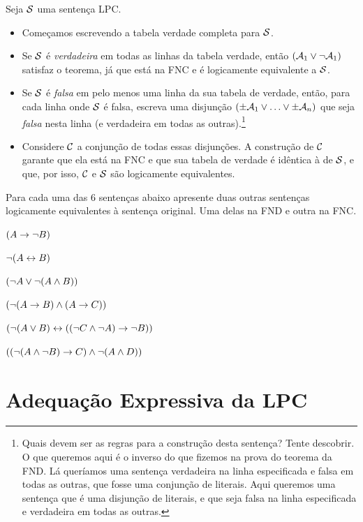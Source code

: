 Seja $\mathcal{S}$ uma sentença LPC.
	\begin{itemize}
       	\item Começamos escrevendo a tabela verdade completa para $\mathcal{S}$.
       	\item Se $\mathcal{S}$ é \emph{verdadeira} em todas as linhas da tabela verdade, então $(\mathcal{A}_1 \vee \neg \mathcal{A}_1)$ satisfaz o teorema, já que está na FNC e é logicamente equivalente a $\mathcal{S}$.
       	\item Se $\mathcal{S}$ é \emph{falsa} em pelo menos uma linha da sua tabela de verdade, então, para cada linha onde $\mathcal{S}$ é falsa, escreva uma disjunção $(\pm\mathcal{A}_1 \vee \ldots \vee \pm\mathcal{A}_n)$ que seja \emph{falsa} nesta linha (e verdadeira em todas as outras).\footnote{
       	Quais devem ser as regras para a construção desta sentença? Tente descobrir. O que queremos aqui é o inverso do que fizemos na prova do teorema da FND.
       	Lá queríamos uma sentença verdadeira na linha especificada e falsa em todas as outras, que fosse uma conjunção de literais.
       	Aqui queremos uma sentença que é uma disjunção de literais, e que seja falsa na linha especificada e verdadeira em todas as outras.}
       	\item Considere $\mathcal{C}$ a conjunção de todas essas disjunções.
       	A construção de $\mathcal{C}$ garante que ela está na FNC e que sua tabela de verdade é idêntica à de $\mathcal{S}$, e que, por isso, $\mathcal{C}$ e $\mathcal{S}$ são logicamente equivalentes.
	\end{itemize}
       
 
\practiceproblems
\problempart
\label{pr.DNF}
Para cada uma das 6 sentenças abaixo apresente duas outras sentenças logicamente equivalentes à sentença original.
Uma delas na FND e outra na FNC.
	\begin{earg}
		\item $(A \rightarrow \neg B)$
		\item $\neg (A \leftrightarrow B)$
		\item $(\neg A \vee \neg (A \wedge B))$
		\item $(\neg (A \rightarrow B ) \wedge (A \rightarrow C))$
		\item $(\neg (A \vee B) \leftrightarrow ((\neg C \wedge \neg A) \rightarrow \neg B))$
		\item $((\neg (A \wedge \neg B) \rightarrow C) \wedge \neg (A \wedge D))$
	\end{earg}

        
\section{Adequação Expressiva da LPC}  

